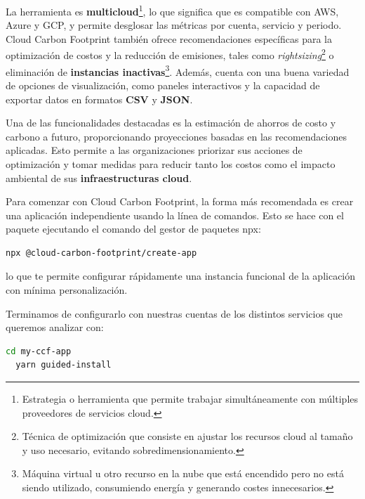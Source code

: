 \documentclass[12pt,a4paper]{report}
\begin{document}
La herramienta es \textbf{multicloud}\footnote{Estrategia o herramienta que
  permite trabajar simultáneamente con múltiples proveedores de servicios
  cloud.}, lo que significa que es compatible con AWS, Azure y GCP, y permite
desglosar las métricas por cuenta, servicio y periodo. Cloud Carbon Footprint
también ofrece recomendaciones específicas para la optimización de costos y la
reducción de emisiones, tales como \textit{rightsizing}\footnote{Técnica de
  optimización que consiste en ajustar los recursos cloud al tamaño y uso
  necesario, evitando sobredimensionamiento.} o eliminación de \textbf{instancias
  inactivas}\footnote{Máquina virtual u otro recurso en la nube que está
  encendido pero no está siendo utilizado, consumiendo energía y generando costes
  innecesarios.}. Además, cuenta con una buena variedad de opciones de
visualización, como paneles interactivos y la capacidad de exportar datos en
formatos \textbf{CSV} y \textbf{JSON}.

Una de las funcionalidades destacadas es la estimación de ahorros de costo y
carbono a futuro, proporcionando proyecciones basadas en las recomendaciones
aplicadas. Esto permite a las organizaciones priorizar sus acciones de
optimización y tomar medidas para reducir tanto los costos como el impacto
ambiental de sus \textbf{infraestructuras cloud}.

Para comenzar con Cloud Carbon Footprint, la forma más recomendada es crear una
aplicación independiente usando la línea de comandos. Esto se hace con el
paquete ejecutando el comando del gestor de paquetes npx:

\begin{tcolorbox}[colback=codebackground, colframe=codeborder, boxrule=0.8pt, arc=0mm, boxsep=5pt, left=5pt, right=5pt, top=5pt, bottom=5pt]
  \begin{lstlisting}[language=bash]
  npx @cloud-carbon-footprint/create-app
  \end{lstlisting}
\end{tcolorbox}

lo que te permite configurar rápidamente una instancia funcional de la
aplicación con mínima personalización.

Terminamos de configurarlo con nuestras cuentas de los distintos servicios que
queremos analizar con:

\begin{tcolorbox}[colback=codebackground, colframe=codeborder, boxrule=0.8pt, arc=0mm, boxsep=5pt, left=5pt, right=5pt, top=5pt, bottom=5pt]
  \begin{lstlisting}[language=bash]
  cd my-ccf-app
  yarn guided-install
  \end{lstlisting}
\end{tcolorbox}
\end{document}
